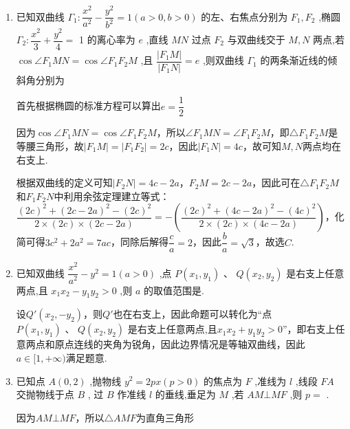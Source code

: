 \begin{enumerate}
\begin{jieda}
        根据对称性可知$|AF_2|=|AF_1|$，因此$r = a = 2$

        \ps 本题若根据双曲线定义，对于焦点三角形$PF_1F_2$应用余弦定理（退化为勾股定理）得到$|PF_1|, |PF_2|$，再求$\triangle PAF_1$的三边后利用等面积法求内切圆半径也可，但计算量要大许多
    \end{jieda}
    \item 已知双曲线 ${\Gamma }_{1} : \dfrac{{x}^{2}}{{a}^{2}} - \dfrac{{y}^{2}}{{b}^{2}} = 1\left( {a > 0,b > 0}\right)$ 的左、右焦点分别为 ${F}_{1},{F}_{2}$ ,椭圆 ${\Gamma }_{2} : \dfrac{{x}^{2}}{3} + \dfrac{{y}^{2}}{4} =$ 1 的离心率为 $e$ ,直线 ${MN}$ 过点 ${F}_{2}$ 与双曲线交于 $M,N$ 两点,若 $\cos \angle {F}_{1}{MN} = \cos \angle {F}_{1}{F}_{2}M$ ,且 $\dfrac{\left| {F}_{1}M\right| }{\left| {F}_{1}N\right| } = e$ ,则双曲线 ${\Gamma }_{1}$ 的两条渐近线的倾斜角分别为
    \begin{jieda}
        首先根据椭圆的标准方程可以算出$e = \dfrac{1}{2}$

        因为$\cos \angle {F}_{1}{MN} = \cos \angle {F}_{1}{F}_{2}M$，所以$\angle {F}_{1}{MN} = \angle {F}_{1}{F}_{2}M$，即$\triangle F_1F_2M$是等腰三角形，故$|F_1M| = |F_1F_2| = 2c$，因此$|F_1N| = 4c$，故可知$M,N$两点均在右支上.

        根据双曲线的定义可知$|F_2N| = 4c-2a$，$F_2M = 2c-2a$，因此可在$\triangle F_1F_2M$和$F_1F_2N$中利用余弦定理建立等式：$\dfrac{(2c)^2+(2c-2a)^2-(2c)^2}{2\times (2c) \times (2c-2a)} = -\left(\dfrac{(2c)^2+(4c-2a)^2-(4c)^2}{2\times (2c) \times (4c-2a)}\right)$，化简可得$3c^2+2a^2 = 7ac$，同除后解得$\dfrac{c}{a} = 2$，因此$\dfrac{b}{a} = \sqrt{3}$，故选$C$.
    \end{jieda}
    \item 已知双曲线 $\dfrac{{x}^{2}}{{a}^{2}} - {y}^{2} = 1\left( {a > 0}\right)$ ,点 $P\left( {{x}_{1},{y}_{1}}\right) \text{ 、 }Q\left( {{x}_{2},{y}_{2}}\right)$ 是右支上任意两点,且 ${x}_{1}{x}_{2} - {y}_{1}{y}_{2} > 0$ ,则 $a$ 的取值范围是\blkda{$[1, +\infty)$}.
    \begin{jieda}
        设$Q'(x_2, -y_2)$，则$Q'$也在右支上，因此命题可以转化为“点 $P\left( {{x}_{1},{y}_{1}}\right) \text{ 、 }Q\left( {{x}_{2},{y}_{2}}\right)$ 是右支上任意两点,且${x}_{1}{x}_{2} + {y}_{1}{y}_{2} > 0$”，即右支上任意两点和原点连线的夹角为锐角，因此边界情况是等轴双曲线，因此$a \in [1, +\infty)$满足题意.
    \end{jieda}
    \item 已知点 $A\left( {0,2}\right)$ ,抛物线 ${y}^{2} = {2px}\left( {p > 0}\right)$ 的焦点为 $F$ ,准线为 $l$ ,线段 ${FA}$ 交抛物线于点 $B$ , 过 $B$ 作准线 $l$ 的垂线,垂足为 $M$ ,若 ${AM}\bot {MF}$ ,则 $p =$ .
    \begin{jieda}
        因为${AM}\bot {MF}$，所以$\triangle AMF$为直角三角形


\end{jieda}
\end{enumerate}
